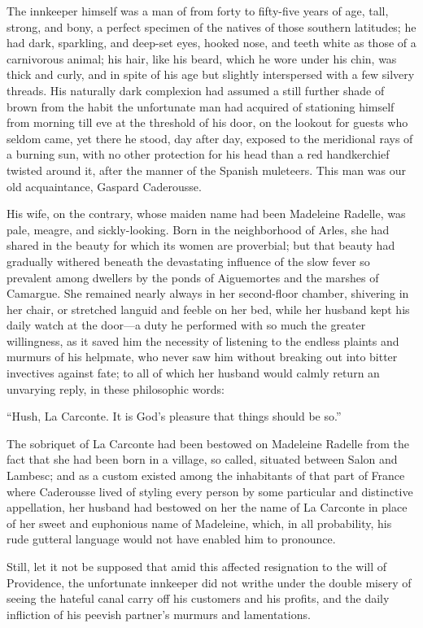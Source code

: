 The innkeeper himself was a man of from forty to fifty-five years of
age, tall, strong, and bony, a perfect specimen of the natives of those
southern latitudes; he had dark, sparkling, and deep-set eyes, hooked
nose, and teeth white as those of a carnivorous animal; his hair, like
his beard, which he wore under his chin, was thick and curly, and in
spite of his age but slightly interspersed with a few silvery threads.
His naturally dark complexion had assumed a still further shade of
brown from the habit the unfortunate man had acquired of stationing
himself from morning till eve at the threshold of his door, on the
lookout for guests who seldom came, yet there he stood, day after day,
exposed to the meridional rays of a burning sun, with no other
protection for his head than a red handkerchief twisted around it,
after the manner of the Spanish muleteers. This man was our old
acquaintance, Gaspard Caderousse.

His wife, on the contrary, whose maiden name had been Madeleine
Radelle, was pale, meagre, and sickly-looking. Born in the neighborhood
of Arles, she had shared in the beauty for which its women are
proverbial; but that beauty had gradually withered beneath the
devastating influence of the slow fever so prevalent among dwellers by
the ponds of Aiguemortes and the marshes of Camargue. She remained
nearly always in her second-floor chamber, shivering in her chair, or
stretched languid and feeble on her bed, while her husband kept his
daily watch at the door—a duty he performed with so much the greater
willingness, as it saved him the necessity of listening to the endless
plaints and murmurs of his helpmate, who never saw him without breaking
out into bitter invectives against fate; to all of which her husband
would calmly return an unvarying reply, in these philosophic words:

“Hush, La Carconte. It is God’s pleasure that things should be so.”

The sobriquet of La Carconte had been bestowed on Madeleine Radelle
from the fact that she had been born in a village, so called, situated
between Salon and Lambesc; and as a custom existed among the
inhabitants of that part of France where Caderousse lived of styling
every person by some particular and distinctive appellation, her
husband had bestowed on her the name of La Carconte in place of her
sweet and euphonious name of Madeleine, which, in all probability, his
rude gutteral language would not have enabled him to pronounce.

Still, let it not be supposed that amid this affected resignation to
the will of Providence, the unfortunate innkeeper did not writhe under
the double misery of seeing the hateful canal carry off his customers
and his profits, and the daily infliction of his peevish partner’s
murmurs and lamentations.

